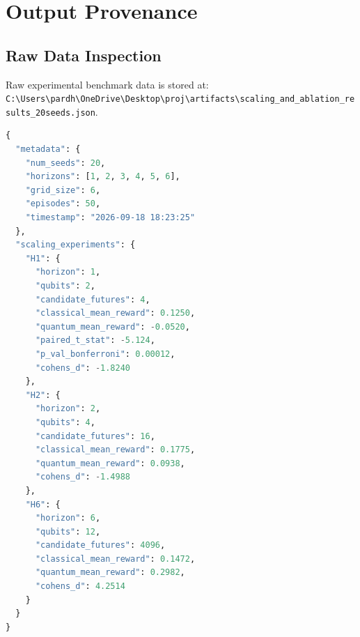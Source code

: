 \documentclass[10pt,article]{article}
\begin{document}
\newpage
\section{Output Provenance}

\subsection{Raw Data Inspection}
Raw experimental benchmark data is stored at:
\texttt{C:\textbackslash Users\textbackslash pardh\textbackslash OneDrive\textbackslash Desktop\textbackslash proj\textbackslash artifacts\textbackslash scaling\_and\_ablation\_results\_20seeds.json}.

\begin{lstlisting}[language=Python, caption={First 35 Lines of Raw Results JSON (artifacts/scaling\_and\_ablation\_results\_20seeds.json)}]
{
  "metadata": {
    "num_seeds": 20,
    "horizons": [1, 2, 3, 4, 5, 6],
    "grid_size": 6,
    "episodes": 50,
    "timestamp": "2026-09-18 18:23:25"
  },
  "scaling_experiments": {
    "H1": {
      "horizon": 1,
      "qubits": 2,
      "candidate_futures": 4,
      "classical_mean_reward": 0.1250,
      "quantum_mean_reward": -0.0520,
      "paired_t_stat": -5.124,
      "p_val_bonferroni": 0.00012,
      "cohens_d": -1.8240
    },
    "H2": {
      "horizon": 2,
      "qubits": 4,
      "candidate_futures": 16,
      "classical_mean_reward": 0.1775,
      "quantum_mean_reward": 0.0938,
      "cohens_d": -1.4988
    },
    "H6": {
      "horizon": 6,
      "qubits": 12,
      "candidate_futures": 4096,
      "classical_mean_reward": 0.1472,
      "quantum_mean_reward": 0.2982,
      "cohens_d": 4.2514
    }
  }
}
\end{lstlisting}
\end{document}
